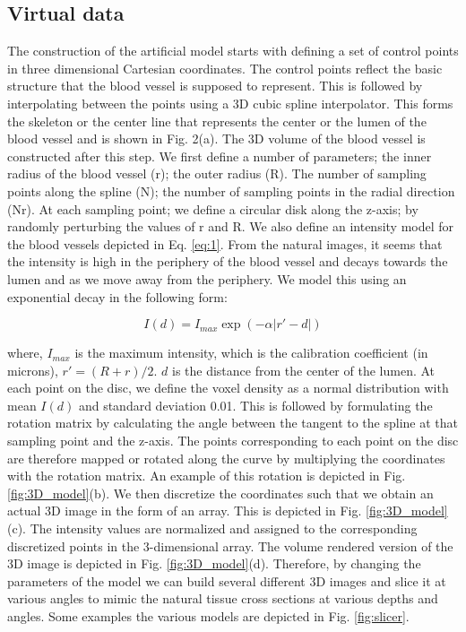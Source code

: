\subsection{Virtual data}
The construction of the artificial model starts with defining a set of control points in three dimensional Cartesian coordinates. The control points reflect the basic structure that the blood vessel is supposed to represent. This is followed by interpolating between the points using a 3D cubic spline interpolator. This forms the skeleton or the center line that represents the center or the lumen of the blood vessel and is shown in Fig. 2(a). The 3D volume of the blood vessel is constructed after this step. We first define a number of parameters; the inner radius of the blood vessel (r); the outer radius (R). The number of sampling points along the spline (N); the number of sampling points in the radial direction (Nr). At each sampling point; we define a circular disk along the z-axis; by randomly perturbing the values of r and R. We also define an intensity model for the blood vessels depicted in Eq. \ref{eq:1}. From the natural images, it seems that the intensity is high in the periphery of the blood vessel and decays towards the lumen and as we move away from the periphery. We model this using an exponential decay in the following form:

\begin{equation}
I(d) = I_{max} \exp(- \alpha |r\prime - d|)
\label{eq:1}
\end{equation}


where, $I_{max}$  is the maximum intensity, which is the calibration coefficient (in microns), $r\prime=(R+r)/2.$ $d$ is the distance from the center of the lumen. At each point on the disc, we define the voxel density as a normal distribution with mean $I(d)$ and standard deviation 0.01. This is followed by formulating the rotation matrix by calculating the angle between the tangent to the spline at that sampling point and the z-axis. The points corresponding to each point on the disc are therefore mapped or rotated along the curve by multiplying the coordinates with the rotation matrix. An example of this rotation is depicted in Fig. \ref{fig:3D_model}(b). We then discretize the coordinates such that we obtain an actual 3D image in the form of an array. This is depicted in Fig. \ref{fig:3D_model}(c). The intensity values are normalized and assigned to the corresponding discretized points in the 3-dimensional array. The volume rendered version of the 3D image is depicted in Fig. \ref{fig:3D_model}(d). Therefore, by changing the parameters of the model we can build several different 3D images and slice it at various angles to mimic the natural tissue cross sections at various depths and angles. Some examples the various models are depicted in Fig. \ref{fig:slicer}.

